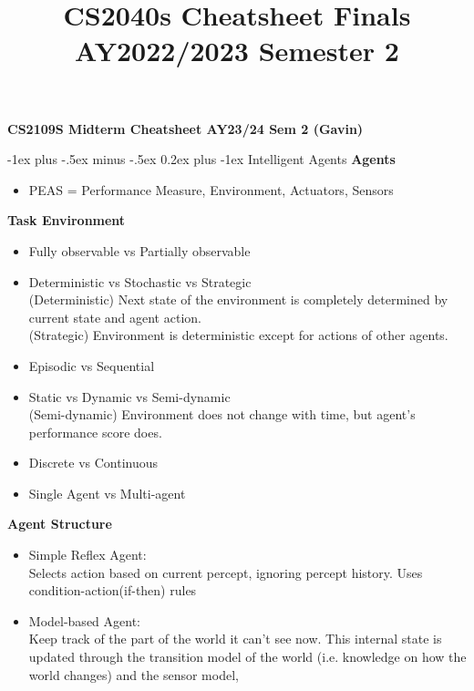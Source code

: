 \documentclass[10pt,landscape]{article}
\title{CS2040s Cheatsheet Finals AY2022/2023 Semester 2}
\makeatletter
\renewcommand{\subsubsection}{\@startsection{subsubsection}{3}{0mm}%
                                {-1ex plus -.5ex minus -.5ex}%
                                {0.2ex plus -1ex}%
                                {\normalfont\footnotesize\bfseries}}
\makeatother
\begin{document}
\raggedright
\footnotesize

\begin{center}
     \Large{\textbf{CS2109S Midterm Cheatsheet AY23/24 Sem 2 (Gavin)}} \\
\end{center}
\begin{multicols}{3}
\setlength{\premulticols}{1pt}
\setlength{\postmulticols}{1pt}
\setlength{\multicolsep}{1pt}
\setlength{\columnsep}{2pt}
\begin{scriptsize}

\subsubsection{Intelligent Agents}
\textbf{Agents} 
\begin{itemize}
  \item PEAS = Performance Measure, Environment, Actuators, Sensors
\end{itemize}
\textbf{Task Environment} 
\begin{itemize}
  \item Fully observable vs Partially observable
  \item Deterministic vs Stochastic vs Strategic 
  \\(Deterministic) Next state of the environment is completely determined by current state and agent action.
  \\(Strategic) Environment is deterministic except for actions of other agents.
  \item Episodic vs Sequential
  \item Static vs Dynamic vs Semi-dynamic
  \\(Semi-dynamic) Environment does not change with time, but agent's performance score does.
  \item Discrete vs Continuous
  \item Single Agent vs Multi-agent
\end{itemize}
\textbf{Agent Structure} 
\begin{itemize}
  \item Simple Reflex Agent:\\Selects action based on current percept, 
  ignoring percept history. Uses condition-action(if-then) rules
  \item Model-based Agent:\\Keep track of the part of
  the world it can’t see now. This internal state is updated
  through the transition model of the world (i.e. knowledge on how the world changes) and the sensor model,

\end{itemize}
\end{scriptsize}
\end{multicols}
\end{document}
